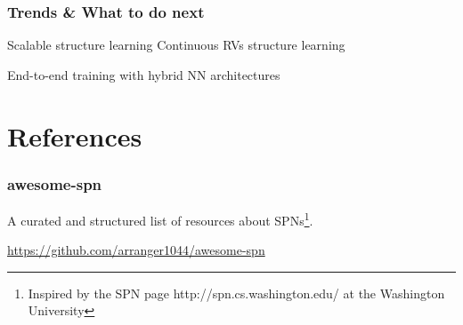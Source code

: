 \documentclass[10pt, t, xcolor={usenames,dvipsnames,svgnames}, compress]{beamer}
\begin{document}
\begin{frame}
  \frametitle{Trends \& What to do next}
  Scalable structure learning
  Continuous RVs structure learning

  End-to-end training with hybrid NN architectures
\end{frame}

\section{References}
{
  \begin{frame}[c]
    \sectionpage
  \end{frame}
}

\begin{frame}
  \frametitle{awesome-spn}
  A curated and structured list of resources about SPNs\footnote{Inspired by the
    SPN page {http://spn.cs.washington.edu/} at the Washington  University}.

  \url{https://github.com/arranger1044/awesome-spn}
\end{frame}

\end{document}
